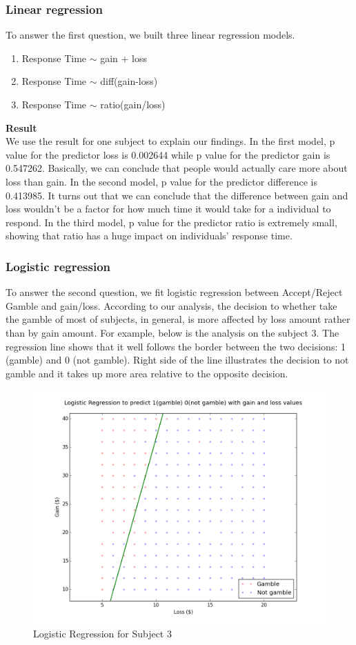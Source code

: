 \subsubsection {Linear regression}
To answer the first question, we built three linear regression models.
\begin{enumerate}
\item  Response Time $\sim$ gain + loss
\item  Response Time $\sim$ diff(gain-loss)
\item  Response Time $\sim$ ratio(gain/loss)
\end {enumerate}
\textbf{Result} \\
We use the result for one subject to explain our findings. In the first model, 
p value for the predictor loss is 0.002644 while p value for the predictor gain 
is 0.547262. Basically, we can conclude that people would actually care more 
about loss than gain. In the second model, p value for the predictor difference
is 0.413985.  It turns out that we can conclude that the difference between gain 
and loss wouldn't be a factor for how much time it would take for a individual 
to respond. In the third model, p value for the predictor ratio is extremely 
small, showing that ratio has a huge impact on individuals' response time.

\subsubsection {Logistic regression}
\noindent
To answer the second question, we fit logistic regression between Accept/Reject
Gamble and gain/loss. According to our analysis, the decision to whether take 
the gamble of most of subjects, in general, is more affected by loss amount 
rather than by gain amount.  For example, below is the analysis on the subject 
3. The regression line shows that it well follows the border between the two 
decisions: 1 (gamble) and 0 (not gamble). Right side of the line illustrates 
the decision to not gamble and it takes up more area relative to the opposite 
decision.
\begin{figure}[H]
    \centering
        \includegraphics[scale=0.5]{log_regression.png}
    \caption{Logistic Regression for Subject 3}
\end{figure}


